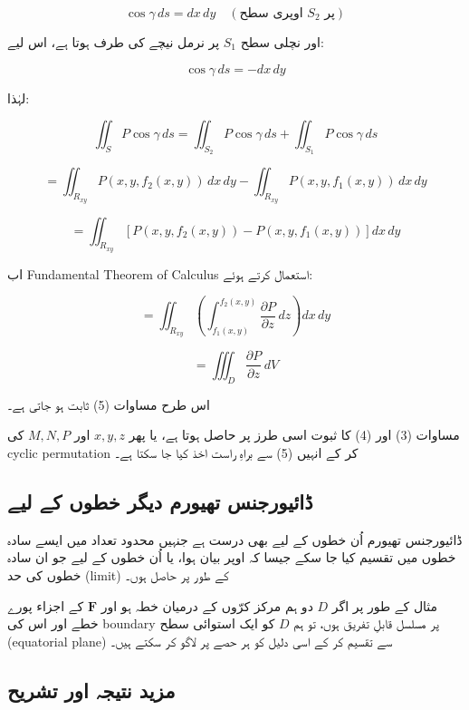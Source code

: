 \begin{enumerate}
\[
\cos \gamma \, ds = dx\,dy
\quad (\text{اوپری سطح } S_2 \text{ پر})
\]

اور نچلی سطح \( S_1 \) پر نرمل نیچے کی طرف ہوتا ہے، اس لیے:

\[
\cos \gamma \, ds = -dx\,dy
\]

\bigskip

لہٰذا:

\[
\iint_S P \cos \gamma \, ds
=
\iint_{S_2} P \cos \gamma \, ds
+
\iint_{S_1} P \cos \gamma \, ds
\]

\[
=
\iint_{R_{xy}} P(x,y,f_2(x,y))\, dx\,dy
-
\iint_{R_{xy}} P(x,y,f_1(x,y))\, dx\,dy
\]

\[
=
\iint_{R_{xy}}
\left[
P(x,y,f_2(x,y)) - P(x,y,f_1(x,y))
\right] dx\,dy
\]

\bigskip

اب Fundamental Theorem of Calculus استعمال کرتے ہوئے:

\[
=
\iint_{R_{xy}}
\left(
\int_{f_1(x,y)}^{f_2(x,y)}
\frac{\partial P}{\partial z}
\, dz
\right)
dx\,dy
\]

\[
=
\iiint_D \frac{\partial P}{\partial z}\, dV
\]

اس طرح مساوات (5) ثابت ہو جاتی ہے۔

\bigskip

مساوات (3) اور (4) کا ثبوت اسی طرز پر حاصل ہوتا ہے، یا پھر \( x,y,z \) اور \( M,N,P \) کی cyclic permutation کر کے انہیں (5) سے براہِ راست اخذ کیا جا سکتا ہے۔

\bigskip

\subsection*{ڈائیورجنس تھیورم دیگر خطوں کے لیے}

ڈائیورجنس تھیورم اُن خطوں کے لیے بھی درست ہے جنہیں محدود تعداد میں ایسے سادہ خطوں میں تقسیم کیا جا سکے جیسا کہ اوپر بیان ہوا، یا اُن خطوں کے لیے جو ان سادہ خطوں کی حد (limit) کے طور پر حاصل ہوں۔

مثال کے طور پر اگر \( D \) دو ہم مرکز کرّوں کے درمیان خطہ ہو اور \( \mathbf{F} \) کے اجزاء پورے خطے اور اس کی boundary پر مسلسل قابلِ تفریق ہوں، تو ہم \( D \) کو ایک استوائی سطح (equatorial plane) سے تقسیم کر کے اسی دلیل کو ہر حصے پر لاگو کر سکتے ہیں۔





\subsection*{مزید نتیجہ اور تشریح}


\end{enumerate}

